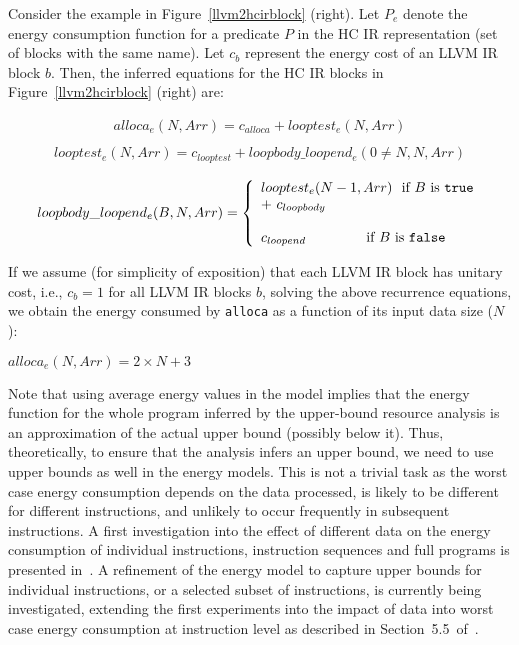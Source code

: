 \documentclass{llncs}
\newcommand{\hcir}{HC IR\xspace}
\newcommand{\llvmir}{LLVM IR\xspace}
\begin{document}
Consider the example in Figure~\ref{llvm2hcirblock} (right). Let $P_e$ denote
the energy consumption function for a predicate $P$ in the \hcir
representation (set of blocks with the same name). Let $c_b$ represent
the energy cost of an \llvmir block $b$.
Then, the inferred equations for the \hcir blocks in
Figure~\ref{llvm2hcirblock} (right) are:

$$
\begin{array}{rcl}
alloca_{e}(N, Arr) = c_{alloca} + looptest_{e}(N, Arr) \\
\end{array}
$$
\vspace*{-5mm}
$$
\begin{array}{rcl}
looptest_{e}(N, Arr) = c_{looptest} + loopbody\_loopend_{e}(0 \neq N, N, Arr)\\
\end{array}
$$
\vspace*{-5mm}
$$
\begin{array}{rcl}
loopbody\_loopend_{e}(B, N, Arr)  = 


\left\{
\begin{array}{lr}
looptest_{e}(N-1, Arr) \ \ \text{if } B \text{ is {\tt true}} \\
     + \ c_{loopbody} \\ \\
                           

c_{loopend} \ \quad\quad\quad\quad \text{if } B \text{ is {\tt false}}
\end{array}
\right.
\end{array}
$$


If we assume (for simplicity of exposition) that each \llvmir block
has unitary cost, i.e., $c_b = 1$ for all \llvmir blocks $b$, solving
the above recurrence equations, we obtain the energy consumed by
\texttt{alloca} as a function of its input data size ($N$):
\begin{center}
$alloca_{e}(N, Arr) = 2 \times N + 3$
\end{center}

Note that using average energy values in the model implies that the energy
function for the whole program inferred by the upper-bound resource
analysis is an approximation of the actual upper bound (possibly below
it).  Thus, theoretically, to ensure that the analysis infers an
upper bound, we need to use upper bounds as well in the energy models.
This is not a trivial task as the worst case energy consumption depends on the
data processed, is likely to be different for different instructions, and
unlikely to occur frequently in subsequent instructions. 
A first investigation into the effect of different data on the energy consumption of individual instructions, instruction sequences and full programs is presented in~\cite{pallister2015data}. 
A refinement of the energy model to capture upper bounds for individual
instructions, or a selected subset of instructions, is currently being
investigated, extending the first experiments into the impact of data into
worst case energy consumption at instruction level as described in
Section~5.5~of~\cite{Kerrison13}.
\end{document}
